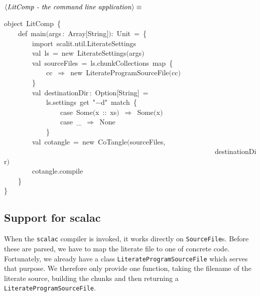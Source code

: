 \documentclass[a4paper,12pt]{article}
\begin{document}
$\left<\mbox{\emph{LitComp - the command line application}}\right>\equiv$
\begin{program}{\vem object}~LitComp~{\small\{}
\\~~~~{\vem def}~main$($args\,{\rm :}~Array$[$String$]$$)${\rm :}~Unit~=~{\small\{}
\\~~~~~~~~{\vem import}~scalit.util.LiterateSettings
\\[0.5em]~~~~~~~~{\vem val}~ls~=~{\vem new}~LiterateSettings$($args$)$
\\[0.5em]~~~~~~~~{\vem val}~sourceFiles~=~ls.chunkCollections~map~{\small\{}
\\~~~~~~~~~~~~cc~$\Rightarrow$~{\vem new}~LiterateProgramSourceFile$($cc$)$
\\~~~~~~~~{\small\}}
\\[0.5em]~~~~~~~~{\vem val}~destinationDir\,{\rm :}~Option$[$String$]$~=
\\~~~~~~~~~~~~ls.settings~get~"$-$d"~{\vem match}~{\small\{}
\\~~~~~~~~~~~~~~~~{\vem case}~Some$($x~{\rm :}{\rm :}~xs$)$~$\Rightarrow$~Some$($x$)$
\\~~~~~~~~~~~~~~~~{\vem case}~\_~$\Rightarrow$~None
\\~~~~~~~~~~~~{\small\}}
\\[0.5em]~~~~~~~~{\vem val}~cotangle~=~{\vem new}~CoTangle$($sourceFiles,
\\~~~~~~~~~~~~~~~~~~~~~~~~~~~~~~~~~~~~~~~~~~~~~~~~~~~~~~~~~~~~destinationDir$)$
\\[0.5em]~~~~~~~~cotangle.compile
\\~~~~{\small\}}
\\{\small\}}
\\[0.5em]\end{program}



\subsection{Support for scalac}
When the \texttt{scalac} compiler is invoked, it works directly on \texttt{SourceFile}s. Before these
are parsed, we have to map the literate file to one of concrete code. Fortunately, we already
have a class \texttt{LiterateProgramSourceFile} which serves that purpose. We therefore only provide
one function, taking the filename of the literate source, building the chunks and then returning
a \texttt{LiterateProgramSourceFile}.
\end{document}

